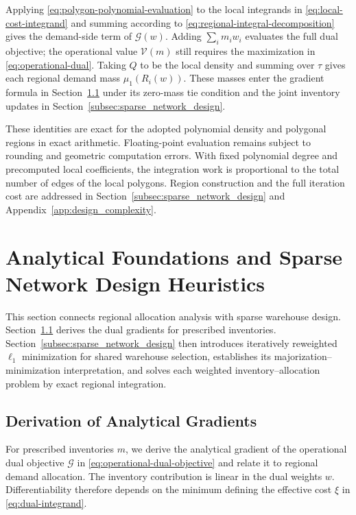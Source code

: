 \documentclass[a4paper,fleqn]{cas-sc}
\theoremstyle{remark}
\theoremstyle{plain}
\begin{document}
Applying \eqref{eq:polygon-polynomial-evaluation} to the local integrands in \eqref{eq:local-cost-integrand} and summing according to \eqref{eq:regional-integral-decomposition} gives the demand-side term of $\mathcal G(w)$. Adding $\sum_i m_iw_i$ evaluates the full dual objective; the operational value $\mathcal V(m)$ still requires the maximization in \eqref{eq:operational-dual}. Taking $Q$ to be the local density and summing over $\tau$ gives each regional demand mass $\mu_1(R_i(w))$. These masses enter the gradient formula in Section~\ref{subsec:continuous_geometric_flow} under its zero-mass tie condition and the joint inventory updates in Section~\ref{subsec:sparse_network_design}.

These identities are exact for the adopted polynomial density and polygonal regions in exact arithmetic. Floating-point evaluation remains subject to rounding and geometric computation errors. With fixed polynomial degree and precomputed local coefficients, the integration work is proportional to the total number of edges of the local polygons. Region construction and the full iteration cost are addressed in Section~\ref{subsec:sparse_network_design} and Appendix~\ref{app:design_complexity}.


\section{Analytical Foundations and Sparse Network Design Heuristics}\label{sec:section4}

This section connects regional allocation analysis with sparse warehouse design. Section~\ref{subsec:continuous_geometric_flow} derives the dual gradients for prescribed inventories. Section~\ref{subsec:sparse_network_design} then introduces iteratively reweighted $\ell_1$ minimization for shared warehouse selection, establishes its majorization--minimization interpretation, and solves each weighted inventory--allocation problem by exact regional integration.

\subsection{Derivation of Analytical Gradients}\label{subsec:continuous_geometric_flow}

For prescribed inventories $m$, we derive the analytical gradient of the operational dual objective $\mathcal G$ in \eqref{eq:operational-dual-objective} and relate it to regional demand allocation. The inventory contribution is linear in the dual weights $w$. Differentiability therefore depends on the minimum defining the effective cost $\xi$ in \eqref{eq:dual-integrand}.
\end{document}
